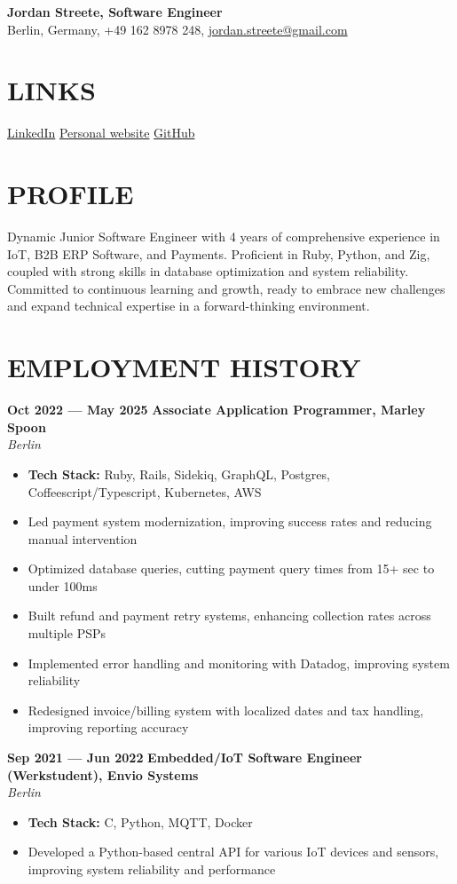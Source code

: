 \documentclass[11pt,a4paper]{article}
\newcommand{\resumesection}[1]{
  \section*{\textcolor{sectioncolor}{\MakeUppercase{#1}}}
}
\newcommand{\job}[4]{
  \textbf{#1 — #2} \hfill \textbf{#3} \\
  \textit{#4}
}
\begin{document}
{\LARGE\textbf{Jordan Streete, Software Engineer}}\\
Berlin, Germany, +49 162 8978 248, \href{mailto:jordan.streete+work-apps-2025@gmail.com}{jordan.streete@gmail.com}

\resumesection{Links}
\href{https://www.linkedin.com/in/jordan-streete-0b8b3711a/}{LinkedIn} \hfill
\href{https://jstr.dev}{Personal website} \hfill
\href{https://github.com/BoundlessCarrot}{GitHub}

\resumesection{Profile}
Dynamic Junior Software Engineer with 4 years of comprehensive experience in IoT, B2B ERP Software, and Payments. Proficient in Ruby, Python, and Zig, coupled with strong skills in database optimization and system reliability. Committed to continuous learning and growth, ready to embrace new challenges and expand technical expertise in a forward-thinking environment.

\resumesection{Employment \hspace{0.1em} History}

\job{Oct 2022} {May 2025} {Associate Application Programmer, Marley Spoon} {Berlin}
\begin{itemize}[leftmargin=*,label=$\bullet$,itemsep=0.3ex]
    \item \textbf{Tech Stack:} Ruby, Rails, Sidekiq, GraphQL, Postgres, Coffeescript/Typescript, Kubernetes, AWS
    \item Led payment system modernization, improving success rates and reducing manual intervention
    \item Optimized database queries, cutting payment query times from 15+ sec to under 100ms
    \item Built refund and payment retry systems, enhancing collection rates across multiple PSPs
    \item Implemented error handling and monitoring with Datadog, improving system reliability
    \item Redesigned invoice/billing system with localized dates and tax handling, improving reporting accuracy
\end{itemize}
  
\job{Sep 2021} {Jun 2022} {Embedded/IoT Software Engineer (Werkstudent), Envio Systems} {Berlin}
\begin{itemize}[leftmargin=*,label=$\bullet$,itemsep=0.3ex]
    \item \textbf{Tech Stack:} C, Python, MQTT, Docker
    \item Developed a Python-based central API for various IoT devices and sensors, improving system reliability and performance
\end{itemize}
\end{document}
